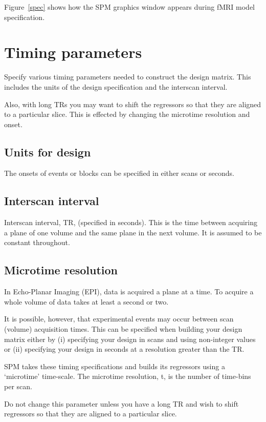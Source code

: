 Figure~\ref{spec} shows how the SPM graphics window appears during fMRI model specification. 

\section{Timing parameters}

Specify various timing parameters needed to construct the design matrix. This includes the units of the design specification and the interscan interval.

Also, with long TRs you may want to shift the regressors so that they are aligned to a particular slice.  This is effected by changing the microtime resolution and onset. 

\subsection{Units for design}

The onsets of events or blocks can be specified in either scans or seconds.

\subsection{Interscan interval}

Interscan interval, TR, (specified in seconds).  This is the time between acquiring a plane of one volume and the same plane in the next volume.  It is assumed to be constant throughout.

\subsection{Microtime resolution}

In Echo-Planar Imaging (EPI), data is acquired a plane at a time. To acquire a whole volume of data takes at least a second or two.

It is possible, however, that experimental events may occur between scan (volume) acquisition times. This can be specified when building your design matrix either by (i) specifying your design in scans and using non-integer values  or (ii) specifying your design in seconds at a resolution greater than the TR.

SPM takes these timing specifications and builds its regressors using a `microtime' time-scale. The microtime resolution, t, is the number of time-bins per scan. 

Do not change this parameter unless you have a long TR and wish to shift regressors so that they are aligned to a particular slice. 

